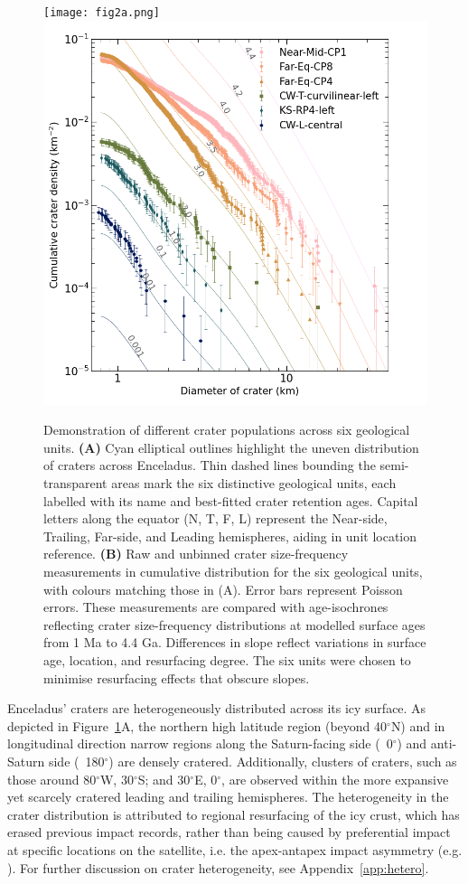 \documentclass[preprint,12pt,3p,times,authoryear]{elsarticle}
\begin{document}
\begin{figure}[ht!]
    \centering
    \texttt{[image: fig2a.png]}
    \includegraphics[width=0.5\linewidth]{fig2b.png}
    \caption{Demonstration of different crater populations across six geological units.
        \textbf{(A)} Cyan elliptical outlines highlight the uneven distribution of craters across Enceladus. Thin dashed lines bounding the semi-transparent areas mark the six distinctive geological units, each labelled with its name and best-fitted crater retention ages. Capital letters along the equator (N, T, F, L) represent the Near-side, Trailing, Far-side, and Leading hemispheres, aiding in unit location reference.
        \textbf{(B)} Raw and unbinned crater size-frequency measurements in cumulative distribution for the six geological units, with colours matching those in (A). Error bars represent Poisson errors. These measurements are compared with age-isochrones reflecting crater size-frequency distributions at modelled surface ages from 1 Ma to 4.4 Ga. Differences in slope reflect variations in surface age, location, and resurfacing degree. The six units were chosen to minimise resurfacing effects that obscure slopes. }
    \label{fig:crater}
\end{figure}

Enceladus' craters are heterogeneously distributed across its icy surface. As depicted in Figure~\ref{fig:crater}A, the northern high latitude region (beyond 40$^\circ$N) and in longitudinal direction narrow regions along the Saturn-facing side (~0$^\circ$) and anti-Saturn side (~180$^\circ$) are densely cratered. Additionally, clusters of craters, such as those around 80$^\circ$W, 30$^\circ$S; and 30$^\circ$E, 0$^\circ$, are observed within the more expansive yet scarcely cratered leading and trailing hemispheres. The heterogeneity in the crater distribution is attributed to regional resurfacing of the icy crust, which has erased previous impact records, rather than being caused by preferential impact at specific locations on the satellite, i.e. the apex-antapex impact asymmetry (e.g. \citealt{Cuk2016}). For further discussion on crater heterogeneity, see Appendix~\ref{app:hetero}.\\
\end{document}
